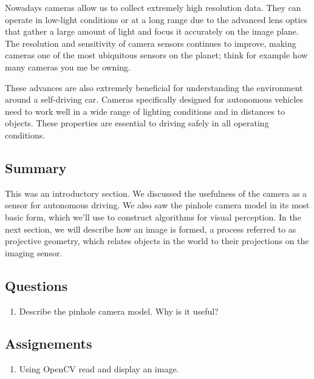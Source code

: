 Nowadays  cameras allow us to collect extremely high resolution data. They can operate in
low-light conditions or at a long range due to the advanced lens optics
that gather a large amount of light and focus it
accurately on the image plane. The resolution and sensitivity of camera sensors
continues to improve, making cameras one of the most ubiquitous sensors on the planet; think for example how many cameras you me be owning.

These advances are also
extremely beneficial for understanding the environment around a self-driving car.  
Cameras specifically designed for autonomous vehicles need to work well in a wide range of lighting conditions and
in distances to objects. These properties are essential to driving safely in all operating conditions. 


\subsection{Summary}

This was an introductory section. We discussed the usefulness of the camera as a sensor
for autonomous driving. We also saw the pinhole
camera model in its most basic form, which we'll use
to construct algorithms for visual perception. In the next section, we will describe how an image is formed, a process referred to
as projective geometry, which relates objects in the world to their projections on the imaging sensor.

\subsection{Questions}

\begin{enumerate}
\item Describe the pinhole camera model. Why is it useful?
\end{enumerate}

\subsection{Assignements}

\begin{enumerate}
\item Using OpenCV read and display an image.
\end{enumerate}

